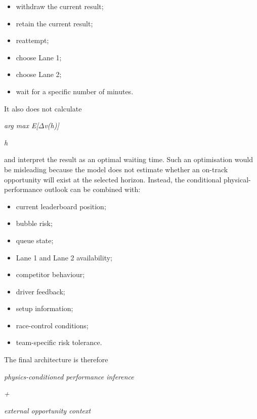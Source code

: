 \begin{itemize}
\item withdraw the current result;
\item retain the current result;
\item reattempt;
\item choose Lane 1;
\item choose Lane 2;
\item wait for a specific number of minutes.
\end{itemize}

It also does not calculate

\begin{center}\textit{arg max E[\ensuremath{\Delta}v(h)]}\end{center}

\begin{center}\textit{h}\end{center}

and interpret the result as an optimal waiting time. Such an optimisation would be misleading because the model does not estimate whether an on-track opportunity will exist at the selected horizon. Instead, the conditional physical-performance outlook can be combined with:

\begin{itemize}
\item current leaderboard position;
\item bubble risk;
\item queue state;
\item Lane 1 and Lane 2 availability;
\item competitor behaviour;
\item driver feedback;
\item setup information;
\item race-control conditions;
\item team-specific risk tolerance.
\end{itemize}

The final architecture is therefore

\begin{center}\textit{physics-conditioned performance inference}\end{center}

\begin{center}\textit{+}\end{center}

\begin{center}\textit{external opportunity context}\end{center}

